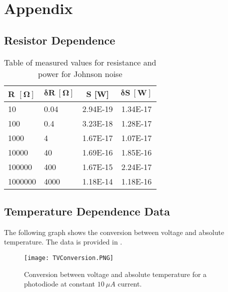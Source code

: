 \section*{Appendix}

\subsection*{Resistor Dependence}

\begin{table}[H]
	\centering
	\begin{tabular}{l l c c} \toprule
		\textbf{R} $\mathbf{[\Omega]}$ & $\mathbf{\delta R \ [\Omega]}$ & \textbf{S [W]}   & $\mathbf{\delta S \ [W]}$  \\ \toprule
		10      & 0.04 & 2.94E-19 & 1.34E-17 \\
		100     & 0.4  & 3.23E-18 & 1.28E-17 \\
		1000    & 4    & 1.67E-17 & 1.07E-17 \\
		10000   & 40   & 1.69E-16 & 1.85E-16 \\
		100000  & 400  & 1.67E-15 & 2.24E-17 \\
		1000000 & 4000 & 1.18E-14 & 1.18E-16 \\
		\bottomrule  
	\end{tabular}
	\caption{Table of measured values for resistance and power for Johnson noise}
	\label{johnsonRTable}
\end{table}

\subsection*{Temperature Dependence Data}
The following graph shows the conversion between voltage and absolute temperature. The data is provided in .

\begin{figure}[H]
	\centering
	\texttt{[image: TVConversion.PNG]}
	\caption{Conversion between voltage and absolute temperature for a photodiode at constant $10 \ \mu A$ current.}
	\label{tvgraph}
\end{figure}



